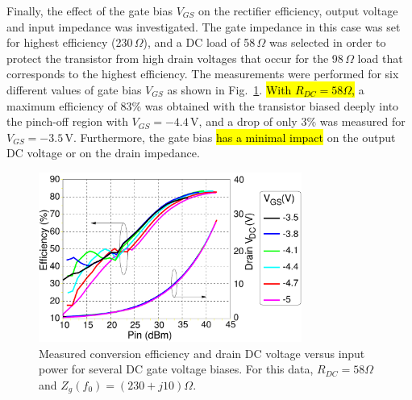 \documentclass[journal]{IEEEtran}
\begin{document}
Finally, the effect of the gate bias $V_{GS}$ on the rectifier efficiency, output voltage and input impedance was investigated. The gate impedance in this case was set for highest efficiency (230\,$\Omega$), and a DC load of 58\,$\Omega$ was selected in order to protect the transistor from high drain voltages that occur for the 98\,$\Omega$ load that corresponds to the highest efficiency. The measurements were performed for six different values of gate bias $V_{GS}$ as shown in Fig.~\ref{VG_sweep_final}. \hl{With $R_{DC}=58\Omega$,} a maximum efficiency of 83\% was obtained with the transistor biased deeply into the pinch-off region with $V_{GS}=-4.4$\,V, and a drop of only  3\% was measured for $V_{GS}=-3.5$\,V. Furthermore, the gate bias \hl{has a minimal impact} on the output DC voltage or on the drain impedance.


\begin{figure}[ht!]
\centering
\includegraphics[width=3.4in]{pdf/15.pdf}
\caption{Measured conversion efficiency and drain DC voltage versus input power for several DC gate voltage biases. For this data, $R_{DC}=58\Omega$ and $Z_g(f_0)=\left(230+j10\right)\Omega$.}
\label{VG_sweep_final}
\end{figure}







%
%
\end{document}
